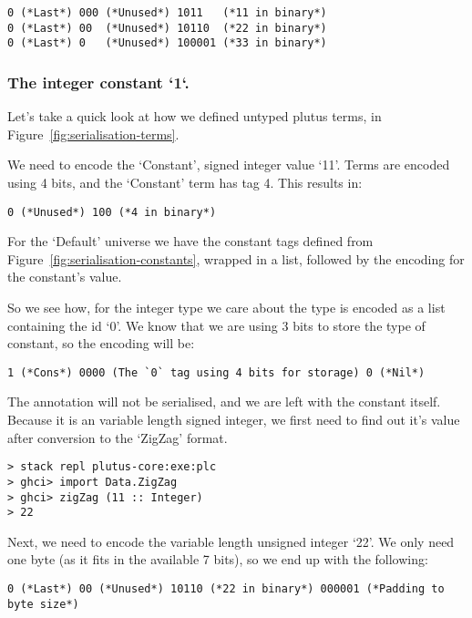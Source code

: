 \documentclass[a4paper]{article}
\begin{document}
\begin{appendices}
\begin{verbatim}
0 (*Last*) 000 (*Unused*) 1011   (*11 in binary*)
0 (*Last*) 00  (*Unused*) 10110  (*22 in binary*)
0 (*Last*) 0   (*Unused*) 100001 (*33 in binary*)
\end{verbatim}

\subsubsection{The integer constant `1`.}

Let's take a quick look at how we defined untyped plutus terms, in Figure~\ref{fig:serialisation-terms}.

We need to encode the `Constant', signed integer value `11'. Terms are encoded using 4 bits, and the `Constant' term has tag 4. This results in:

\begin{verbatim}
0 (*Unused*) 100 (*4 in binary*)
\end{verbatim}

For the `Default' universe we have the constant tags defined from Figure~\ref{fig:serialisation-constants}, wrapped in a list, followed by the encoding for the constant's value.

So we see how, for the integer type we care about the type is encoded as a list containing the id `0'. We know that we are using 3 bits to store the type of constant, so the encoding will be:

\begin{verbatim}
1 (*Cons*) 0000 (The `0` tag using 4 bits for storage) 0 (*Nil*)
\end{verbatim}

The annotation will not be serialised, and we are left with the constant itself. Because it is an variable length signed integer, we first need to find out it's value after conversion to the `ZigZag' format.

\begin{verbatim}
> stack repl plutus-core:exe:plc
> ghci> import Data.ZigZag
> ghci> zigZag (11 :: Integer)
> 22
\end{verbatim}

Next, we need to encode the variable length unsigned integer `22'. We only need one byte (as it fits in the available 7 bits), so we end up with the following:

\begin{verbatim}
0 (*Last*) 00 (*Unused*) 10110 (*22 in binary*) 000001 (*Padding to byte size*)
\end{verbatim}


\end{appendices}
\end{document}

